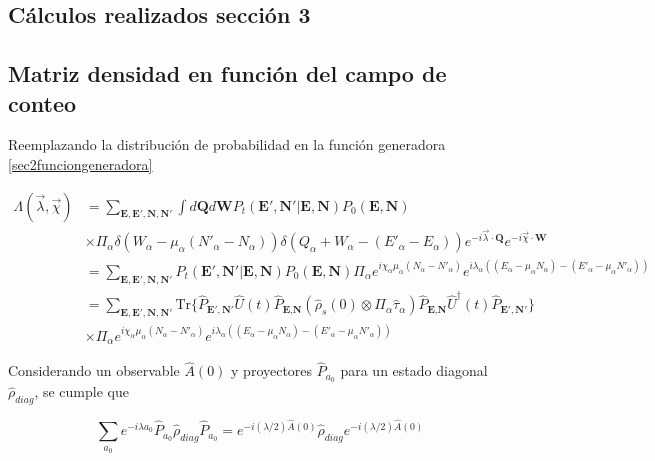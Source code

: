 \begin{appendixs}
	
	\section{Cálculos realizados sección 3}

	\subsection{Matriz densidad en función del campo de conteo}
    \label{apendix:fcs1}
    Reemplazando la distribución de probabilidad en la función generadora \ref{sec2funciongeneradora}

    \begin{align*}
        \Lambda(\vec{\lambda},\vec{\chi}) & = \sum_{\textbf{E},\textbf{E}',\textbf{N},\textbf{N}'} \int d\textbf{Q}d\textbf{W} P_{t}(\textbf{E}',\textbf{N}'|\textbf{E},\textbf{N}) P_{0}(\textbf{E},\textbf{N})  \\
        & \times \Pi_{\alpha} \delta(W_{\alpha} - \mu_{\alpha}(N'_{\alpha} - N_{\alpha}) ) \delta(Q_{\alpha} + W_{\alpha} -(E'_{\alpha} - E_{\alpha})) e^{-i\vec{\lambda}\cdot \textbf{Q}} e^{-i\vec{\chi}\cdot \textbf{W}} \\
        & = \sum_{\textbf{E},\textbf{E}',\textbf{N},\textbf{N}'}P_{t}(\textbf{E}',\textbf{N}'|\textbf{E},\textbf{N})P_{0}(\textbf{E},\textbf{N}) \Pi_{\alpha}e^{i\chi_{\alpha}\mu_{\alpha}(N_{\alpha} - N'_{\alpha})}e^{i\lambda_{\alpha}((E_{\alpha} -\mu_{\alpha}N_{\alpha}) - (E'_{\alpha} - \mu_{\alpha}N'_{\alpha}) ) }  \\
        & = \sum_{\textbf{E},\textbf{E}',\textbf{N},\textbf{N}'} \text{Tr}\{\hat{P}_{\textbf{E}',\textbf{N}'}\hat{U}(t)\hat{P}_{\textbf{E},\textbf{N}}(\hat{\rho}_{s}(0) \otimes \Pi_{\alpha}\hat{\tau}_{\alpha} )\hat{P}_{\textbf{E},\textbf{N}}\hat{U}^{\dagger}(t)\hat{P}_{\textbf{E}',\textbf{N}'}   \} \\
        & \times \Pi_{\alpha} e^{i\chi_{\alpha}\mu_{\alpha}(N_{\alpha} - N'_{\alpha})}e^{i\lambda_{\alpha}((E_{\alpha} -\mu_{\alpha}N_{\alpha}) - (E'_{\alpha} - \mu_{\alpha}N'_{\alpha}) ) }
    \end{align*}

Considerando un observable $\hat{A}(0)$ y proyectores $\hat{P}_{a_{0}}$ para un estado diagonal $\hat{\rho}_{diag}$\cite{esposito2009nonequilibrium}, se cumple que

\begin{equation}
    \sum_{a_{0}}e^{-i\lambda a_{0}}\hat{P}_{a_{0}}\hat{\rho}_{diag}\hat{P}_{a_{0}} = e^{-i(\lambda/2)\hat{A}(0)}\hat{\rho}_{diag}e^{-i(\lambda/2)\hat{A}(0)}
\label{apendixobservable}
\end{equation}


\end{appendixs}
